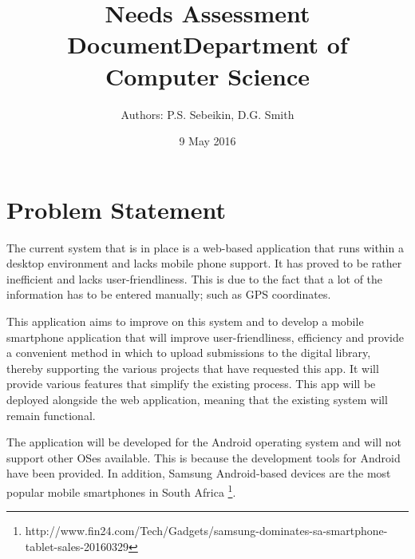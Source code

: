 \documentclass[12pt,a4paper,oneside]{article}
\begin{document}
\title{Needs Assessment Document\newline Department of Computer Science}
\author{Authors: P.S. Sebeikin, D.G. Smith}
\date {9 May 2016}
\maketitle
\pagebreak
\tableofcontents
\pagebreak %

\section{Problem Statement}
  \begin{spacing}{1.4}
    The current system that is in place is a web-based application that runs within a desktop environment and lacks mobile phone support. It has proved to be rather inefficient and lacks user-friendliness. This is due to the fact that a lot of the information has to be entered manually; such as GPS coordinates.

    This application aims to improve on this system and to develop a mobile smartphone application that will improve user-friendliness, efficiency and provide a convenient method in which to upload submissions to the digital library, thereby supporting the various projects that have requested this app. It will provide various features that simplify the existing process. This app will be deployed alongside the web application, meaning that the existing system will remain functional.

    The application will be developed for the Android operating system and will not support other OSes available. This is because the development tools for Android have been provided. In addition, Samsung Android-based devices are the most popular mobile smartphones in South Africa \footnote{http://www.fin24.com/Tech/Gadgets/samsung-dominates-sa-smartphone-tablet-sales-20160329}.
  \end{spacing}

\end{document}
